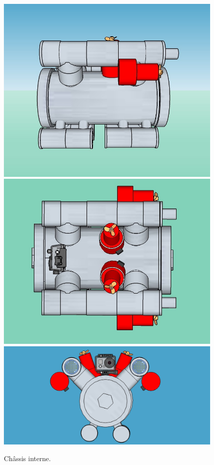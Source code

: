 \documentclass[11pt,a4paper]{article}
\begin{document}
          
        \begin{figure}[H]
          \centering
          \includegraphics[scale=0.27]{ROVGauche.jpg}
          \includegraphics[scale=0.26]{ROVHaut.jpg}
          \includegraphics[scale=0.24]{ROVFace.jpg}
          \caption{Châssis interne.}
          \label{figChassis}
        \end{figure}
\end{document}
